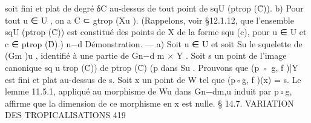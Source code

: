 \documentclass[
  10pt,
]{article}
\newenvironment{Shaded}{}{}
\newcommand{\NormalTok}[1]{#1}
\begin{document}
\begin{Shaded}
\begin{Highlighting}[]
\NormalTok{soit fini et plat de degré δC au{-}dessus de tout point de sqU (ptrop (C̊)).}
\NormalTok{   b) Pour tout u ∈ U , on a C ⊂ gtrop (Xu ).}
\NormalTok{  (Rappelons, voir §12.1.12, que l’ensemble sqU (ptrop (C̊)) est constitué des points de X}
\NormalTok{de la forme squ (c), pour u ∈ U et c ∈ ptrop (D̊).)}
\NormalTok{                                                                       n−d}
\NormalTok{Démonstration. — a) Soit u ∈ U et soit Su le squelette de (Gm              )u , identifié à une}
\NormalTok{partie de Gn−d}
\NormalTok{             m    ×  Y . Soit s un  point de  l’image  canonique  sq u trop (C̊)) de ptrop (C̊)}
\NormalTok{                                                                      (p}
\NormalTok{dans Su . Prouvons que (p ◦ g, f )|Y est fini et plat au{-}dessus de s.}
\NormalTok{  Soit x un point de W tel que (p◦g, f )(x) = s. Le lemme 11.5.1, appliqué au morphisme}
\NormalTok{de Wu dans Gn−dm,u induit par p◦g, affirme que la dimension de ce morphisme en x est nulle.}
\NormalTok{                          § 14.7. VARIATION DES TROPICALISATIONS                             419}


\end{Highlighting}
\end{Shaded}
\end{document}
